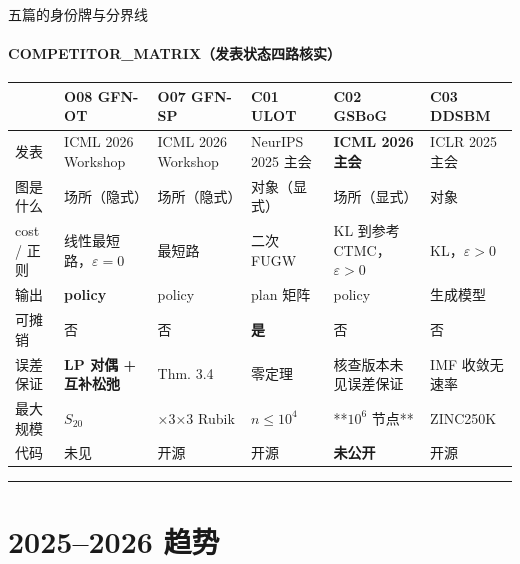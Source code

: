 \documentclass[aspectratio=169,10pt]{beamer}
\newcommand{\con}[1]{\textcolor{negative}{#1}}
\begin{document}
\begin{frame}{五篇的身份牌与分界线}\framesubtitle{COMPETITOR\_MATRIX（发表状态四路核实）}
{\scriptsize\setlength{\tabcolsep}{3pt}\begin{tabular}{@{}>{\RaggedRight\arraybackslash}p{}>{\RaggedRight\arraybackslash}p{}>{\RaggedRight\arraybackslash}p{}>{\RaggedRight\arraybackslash}p{}>{\RaggedRight\arraybackslash}p{}>{\RaggedRight\arraybackslash}p{}@{}}\toprule
\textbf{} & \textbf{O08 GFN-OT} & \textbf{O07 GFN-SP} & \textbf{C01 ULOT} & \textbf{C02 GSBoG} & \textbf{C03 DDSBM} \\\midrule
发表 & \con{ICML 2026 Workshop} & \con{ICML 2026 Workshop} & NeurIPS 2025 主会 & \textbf{ICML 2026 主会} & ICLR 2025 主会 \\\addlinespace[2pt]
图是什么 & 场所（隐式） & 场所（隐式） & 对象（显式） & 场所（显式） & 对象 \\\addlinespace[2pt]
cost / 正则 & 线性最短路，$\varepsilon=0$ & 最短路 & 二次 FUGW & KL 到参考 CTMC，$\varepsilon>0$ & KL，$\varepsilon>0$ \\\addlinespace[2pt]
输出 & \textbf{policy} & policy & plan 矩阵 & policy & 生成模型 \\\addlinespace[2pt]
可摊销 & 否 & 否 & \textbf{是} & 否 & 否 \\\addlinespace[2pt]
误差保证 & \textbf{LP 对偶 + 互补松弛} & Thm. 3.4 & 零定理 & 核查版本未见误差保证 & IMF 收敛无速率 \\\addlinespace[2pt]
最大规模 & $S_{20}$ & 3×3×3 Rubik & $n\le10^4$ & **$10^6$ 节点** & ZINC250K \\\addlinespace[2pt]
代码 & 未见 & 开源 & 开源 & \textbf{未公开} & 开源 \\\bottomrule\end{tabular}}
\vfill\hrule\vspace{2pt}{\footnotesize\textcolor{neutral}{GSBoG 与 O08 同象限、卖点句几乎相同（可执行策略而非静态耦合），却在主会且规模高四个数量级。反制点只有三个：隐式图、不定时域、以及 O08 有 LP 对偶证书而核查版本的 GSBoG 未见任一种明确误差保证。}}
\end{frame}

\section{2025–2026 趋势}
\end{document}
